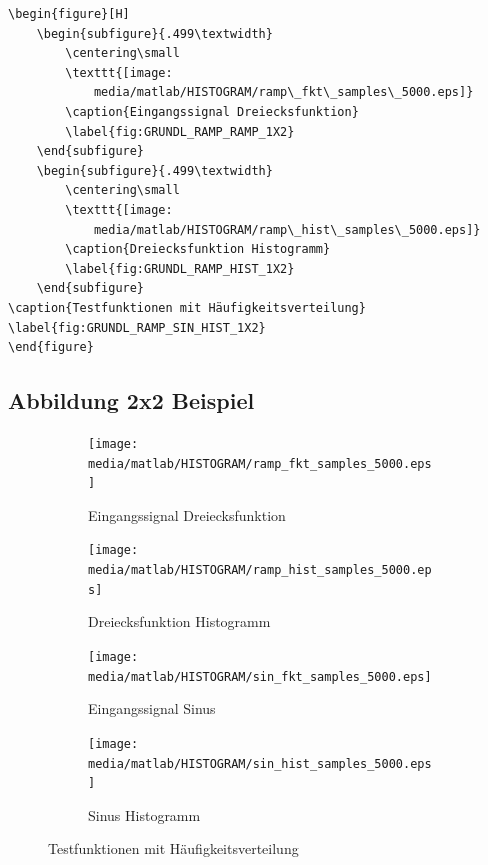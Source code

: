 \documentclass[TGAI_Laborbericht.tex]{subfiles}
\begin{document}
\begin{lstlisting}[style=LATEX, frame=single, caption=\LaTeX ~Befehle Abbildung \ref{fig:GRUNDL_RAMP_SIN_HIST_1X2}, captionpos=b, label=lst:FIG_1X2]
\begin{figure}[H]
	\begin{subfigure}{.499\textwidth}
		\centering\small
		\texttt{[image: 
			media/matlab/HISTOGRAM/ramp\_fkt\_samples\_5000.eps]}
		\caption{Eingangssignal Dreiecksfunktion}
		\label{fig:GRUNDL_RAMP_RAMP_1X2}
	\end{subfigure}
	\begin{subfigure}{.499\textwidth}
		\centering\small
		\texttt{[image: 
			media/matlab/HISTOGRAM/ramp\_hist\_samples\_5000.eps]}
		\caption{Dreiecksfunktion Histogramm}
		\label{fig:GRUNDL_RAMP_HIST_1X2}
	\end{subfigure}
\caption{Testfunktionen mit Häufigkeitsverteilung}
\label{fig:GRUNDL_RAMP_SIN_HIST_1X2}
\end{figure}
\end{lstlisting}

\subsection{Abbildung 2x2 Beispiel}
\begin{figure}[H]
	\begin{subfigure}{.499\textwidth}
		\centering\small
		\texttt{[image: media/matlab/HISTOGRAM/ramp\_fkt\_samples\_5000.eps]}
		\caption{Eingangssignal Dreiecksfunktion}
		\label{fig:GRUNDL_RAMP_RAMP_2X2}
	\end{subfigure}
	\begin{subfigure}{.499\textwidth}
		\centering\small
		\texttt{[image: media/matlab/HISTOGRAM/ramp\_hist\_samples\_5000.eps]}
		\caption{Dreiecksfunktion Histogramm}
		\label{fig:GRUNDL_RAMP_HIST_2X2}
	\end{subfigure}
	\begin{subfigure}{.499\textwidth}
		\centering\small
		\texttt{[image: media/matlab/HISTOGRAM/sin\_fkt\_samples\_5000.eps]}
		\caption{Eingangssignal Sinus}
		\label{fig:GRUNDL_SIN_SIN_2X2}
	\end{subfigure}%
	\begin{subfigure}{.499\textwidth}
		\centering\small
		\texttt{[image: media/matlab/HISTOGRAM/sin\_hist\_samples\_5000.eps]}
		\caption{Sinus Histogramm}
		\label{fig:GRUNDL_SIN_HIST_2X2}	
	\end{subfigure}
\caption{Testfunktionen mit Häufigkeitsverteilung}
\label{fig:GRUNDL_RAMP_SIN_HIST_2X2}
\end{figure}
\end{document}
